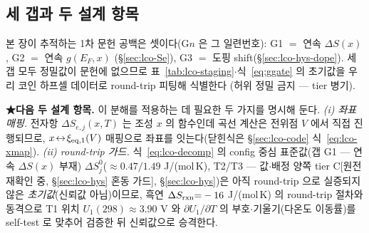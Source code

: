 \subsection{세 갭과 두 설계 항목}\label{sec:lco-decomp-gaps}
본 장이 추적하는 1차 문헌 공백은 셋이다(G$n$ 은 그 일련번호): G1 $=$ 연속 $\Delta S(x)$, G2 $=$ 연속 $g(E_F,x)$
(\S\ref{sec:lco-Se}), G3 $=$ 도핑 shift(\S\ref{sec:lco-hys-dope}). 세 갭 모두 정밀값이 문헌에 없으므로
표~\ref{tab:lco-staging}$\cdot$식~\eqref{eq:ggate} 의 초기값을 우리 코인 하프셀 데이터로 round-trip 피팅해 식별한다
(허위 정밀 금지 --- tier 병기).

\textbf{★다음 두 설계 항목.} 이 분해를 적용하는 데 필요한 두 가지를 명시해 둔다.
\emph{(i) 좌표 매핑.} 전자항 $\Delta S_{e,j}(x,T)$ 는 조성 $x$ 의 함수인데 곡선 계산은 전위점 $V$ 에서 직접 진행되므로,
$x\!\leftrightarrow\!\xi_{\mathrm{eq},1}(V)$ 매핑으로 좌표를 잇는다(닫힌식은 \S\ref{sec:lco-code} 식~\eqref{eq:lco-xmap}).
\emph{(ii) round-trip 가드.} 식~\eqref{eq:lco-decomp} 의 config 중심 표준값(갭 G1 --- 연속 $\Delta S(x)$ 부재)
$\Delta S_j^0$($\approx0.47/1.49$ J/(mol\,K), T2/T3 --- 값$\cdot$배정 양쪽 tier C[원전 재확인 중, \S\ref{sec:lco-hys} 혼동 가드],
\S\ref{sec:lco-hys})은 아직 round-trip 으로 실증되지 않은
\emph{초기값}(신뢰값 아님)이므로, 흑연 $\Delta S_{\mathrm{rxn}}{=}-16$ J/(mol\,K) 의 round-trip 절차와 동격으로 T1 위치
$U_1(298)\approx3.90$ V 와 $\partial U_1/\partial T$ 의 부호$\cdot$기울기(다온도 이동률)를 self-test 로 맞추어
검증한 뒤 신뢰값으로 승격한다.

